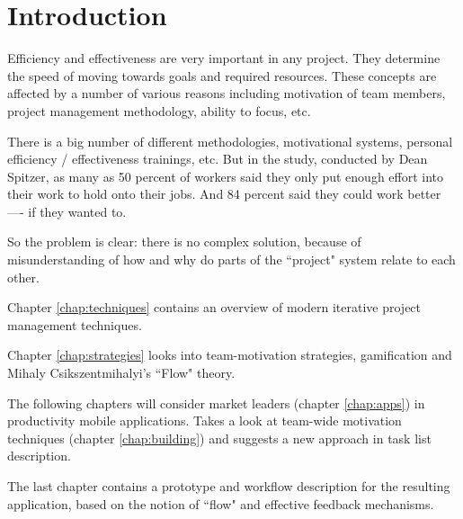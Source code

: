 \chapter*{Introduction}


Efficiency and effectiveness are very important in any project. They determine the speed of moving towards goals and required resources. These concepts are affected by a number of various reasons including motivation of team members, project management methodology, ability to focus, etc.

There is a big number of different methodologies, motivational systems, personal efficiency / effectiveness trainings, etc. But in the study, conducted by Dean Spitzer, as many as 50 percent of workers said they only put enough effort into their work to hold onto their jobs. And 84 percent said they could work better —- if they wanted to. \cite{spitzer}

So the problem is clear: there is no complex solution, because of misunderstanding of how and why do parts of the ``project" system relate to each other.

Chapter \ref{chap:techniques} contains an overview of modern iterative project management techniques.

Chapter \ref{chap:strategies} looks into team-motivation strategies, gamification and Mihaly Csikszentmihalyi's ``Flow" theory.

The following chapters will consider market leaders (chapter \ref{chap:apps}) in productivity mobile applications. Takes a look at team-wide motivation techniques (chapter \ref{chap:building}) and suggests a new approach in task list description.

The last chapter contains a prototype and workflow description for the resulting application, based on the notion of ``flow" and effective feedback mechanisms.